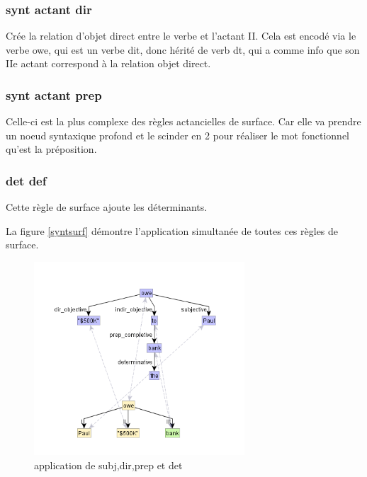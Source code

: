 
\subsubsection{synt actant dir}
Crée la relation d'objet direct entre le verbe et l'actant II. Cela est encodé via le verbe owe, qui est un verbe dit, donc hérité de verb dt, qui a comme info que son IIe actant correspond à la relation objet direct.

\subsubsection{synt actant prep}
Celle-ci est la plus complexe des règles actancielles de surface. Car elle va prendre un noeud syntaxique profond et le scinder en 2 pour réaliser le mot fonctionnel qu'est la préposition. 

\subsubsection{det def}
Cette règle de surface ajoute les déterminants.

La figure \ref{syntsurf} démontre l'application simultanée de toutes ces règles de surface.

\begin{figure}[htb]
	\centering
	\includegraphics[width=0.7\textwidth, trim = {0cm 0cm 0cm 0cm},clip]{ch3/figs/rsynts_syntactisation.png}
	\caption{application de subj,dir,prep et det}
	\label{fig:syntsurf}
\end{figure}


